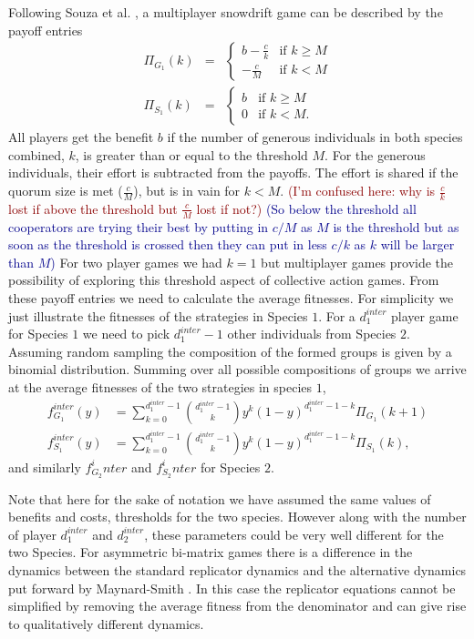 \documentclass[12pt]{article}
\newcommand{\cha}[1]{\textcolor{darkblue}{(#1)}}
\newcommand{\marcus}[1]{\textcolor{darkred}{(#1)}}
\begin{document}
\begin{appendices}
Following Souza et al. \citep{souza:JTB:2009},  
a multiplayer snowdrift game can be described by the payoff entries
\begin{eqnarray}
\Pi_{G_1} (k)  &=& \begin{cases} b-\frac{c}{k} & \textrm{if } k \geq M \\  -\frac{c}{M} & \textrm{if } k < M \end{cases} \nonumber
\\
\Pi_{S_1} (k)  &=& \begin{cases} b & \textrm{if } k \geq M \\ 0 & \textrm{if } k < M. \end{cases}
\label{eqintergamepayoffs}
\end{eqnarray}
%
All players get the benefit $b$ if the number of generous individuals in both species combined, $k$, is greater than or equal to the threshold $M$.
For the generous individuals, their effort is subtracted from the payoffs.
The effort is shared if the quorum size is met ($\frac{c}{M}$), but is in vain for $k<M$. \marcus{I'm confused here: why is $\frac{c}{k}$ lost if above the threshold but  $\frac{c}{M}$ lost if not?}
\cha{So below the threshold all cooperators are trying their best by putting in $c/M$ as $M$ is the threshold but as soon as the threshold is crossed then they can put in less $c/k$ as $k$ will be larger than $M$}
For two player games we had $k=1$ but multiplayer games provide the possibility of exploring this threshold aspect of collective action games.
From these payoff entries we need to calculate the average fitnesses.
For simplicity we just illustrate the fitnesses of the strategies in Species $1$.
For a $d_1^{inter}$ player game for Species $1$ we need to pick $d_1^{inter}-1$ other individuals from Species $2$.
Assuming random sampling the composition of the formed groups is given by a binomial distribution.
Summing over all possible compositions of groups we arrive at  the average fitnesses of the two strategies in species $1$,
%
\begin{align}
f^{inter}_{G_1} (y) &= \sum_{k=0}^{d_1^{inter} -1} \binom{d_1^{inter} -1}{k}y^k (1-y)^{d_1^{inter} -1-k} \Pi_{G_1}(k+1) \nonumber \\
f^{inter}_{S_1} (y) &= \sum_{k=0}^{d_1^{inter} -1} \binom{d_1^{inter} -1}{k}y^k (1-y)^{d_1^{inter} -1-k} \Pi_{S_1}(k),
\label{interfiteqs}
\end{align}
%
and similarly $f_{G_2}^inter$ and $f_{S_2}^inter$ for Species $2$.

Note that here for the sake of notation we have assumed the same values of benefits and costs, thresholds for the two species. However along with the number of player $d_1^{inter}$ and $d_2^{inter}$, these parameters could be very well different for the two Species.
For asymmetric bi-matrix games there is a difference in the dynamics between the standard replicator dynamics and the alternative dynamics put forward by Maynard-Smith \citep{maynard-smith:1982to}.
In this case the replicator equations cannot be simplified by removing the average fitness from the denominator and can give rise to qualitatively different dynamics.


\end{appendices}
\end{document}
